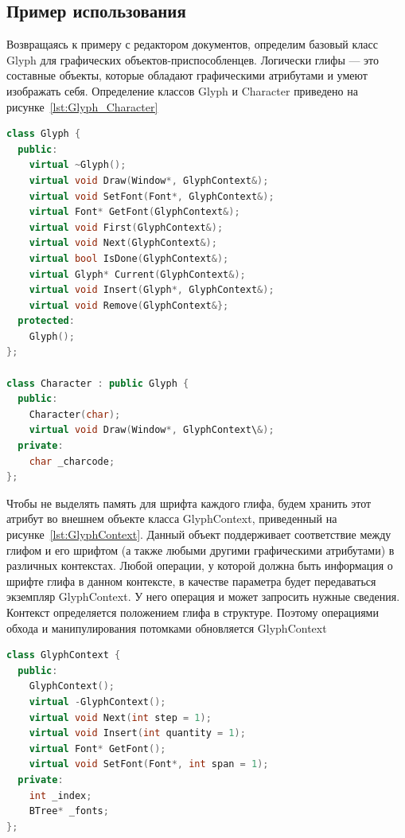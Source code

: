 \subsection{Пример использования}

Возвращаясь к примеру с редактором документов, определим базовый класс
Glyph для графических объектов-приспособленцев.
Логически глифы --- это составные объекты, которые обладают графическими
атрибутами и умеют изображать себя. Определение классов Glyph и Character приведено на рисунке~\ref{lst:Glyph_Character} 

\begin{lstlisting}[float,language=c++,caption=Классы Glyph и Character,label=lst:Glyph_Character]
class Glyph {
  public:
    virtual ~Glyph();
    virtual void Draw(Window*, GlyphContext&);
    virtual void SetFont(Font*, GlyphContext&);
    virtual Font* GetFont(GlyphContext&);
    virtual void First(GlyphContext&);
    virtual void Next(GlyphContext&);
    virtual bool IsDone(GlyphContext&);
    virtual Glyph* Current(GlyphContext&);
    virtual void Insert(Glyph*, GlyphContext&);
    virtual void Remove(GlyphContext&};
  protected:
    Glyph();
};

class Character : public Glyph {
  public:
    Character(char);
    virtual void Draw(Window*, GlyphContext\&);
  private:
    char _charcode;
};
\end{lstlisting}

Чтобы не выделять память для шрифта каждого глифа, будем хранить этот
атрибут во внешнем объекте класса GlyphContext, приведенный на рисунке~\ref{lst:GlyphContext}.
Данный объект поддерживает соответствие между глифом и его шрифтом
(а также любыми другими графическими атрибутами) в различных контекстах.
Любой операции, у которой должна быть информация о шрифте глифа в данном контексте, 
в качестве параметра будет передаваться экземпляр GlyphContext.
У него операция и может запросить нужные сведения. Контекст определяется положением глифа в структуре.
Поэтому операциями обхода и манипулирования потомками обновляется GlyphContext

\begin{lstlisting}[float,language=c++,caption=Класс GlyphContext,label=lst:GlyphContext]
class GlyphContext {
  public:
    GlyphContext();
    virtual -GlyphContext();
    virtual void Next(int step = 1);
    virtual void Insert(int quantity = 1);
    virtual Font* GetFont();
    virtual void SetFont(Font*, int span = 1);
  private:
    int _index;
    BTree* _fonts;
};
\end{lstlisting}

